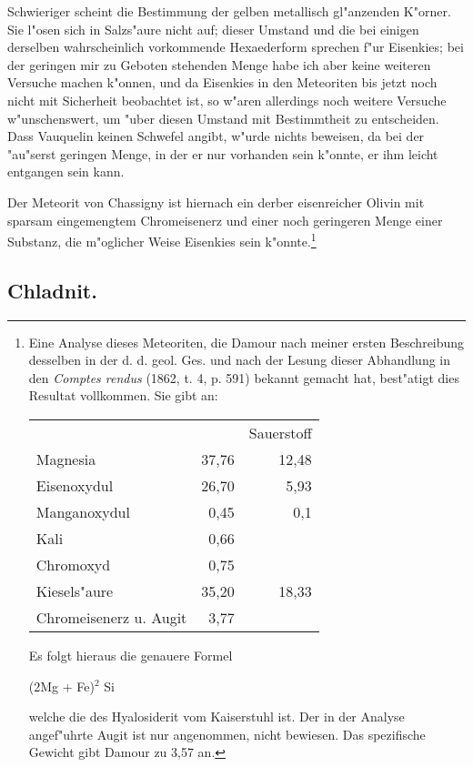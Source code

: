 \documentclass[a4paper, 11pt, oneside, german]{article}
\begin{document}
Schwieriger scheint die Bestimmung der gelben metallisch gl"anzenden K"orner. Sie l"osen sich in Salzs"aure nicht auf; dieser Umstand und die bei einigen derselben wahrscheinlich vorkommende Hexaederform sprechen f"ur Eisenkies; bei der geringen mir zu Geboten stehenden Menge habe ich aber keine weiteren Versuche machen k"onnen, und da Eisenkies in den Meteoriten bis jetzt noch nicht mit Sicherheit beobachtet ist, so w"aren allerdings noch weitere Versuche w"unschenswert, um "uber diesen Umstand mit Bestimmtheit zu entscheiden. Dass Vauquelin keinen Schwefel angibt, w"urde nichts beweisen, da bei der "au"serst geringen Menge, in der er nur vorhanden sein k"onnte, er ihm leicht entgangen sein kann.

Der Meteorit von Chassigny ist hiernach ein derber eisenreicher Olivin mit sparsam eingemengtem Chromeisenerz und einer noch geringeren Menge einer Substanz, die m"oglicher Weise Eisenkies sein k"onnte.\footnote{Eine Analyse dieses Meteoriten, die Damour nach meiner ersten Beschreibung desselben in der d. d. geol. Ges. und nach der Lesung dieser Abhandlung in den \emph{Comptes rendus} (1862, t. 4, p. 591) bekannt gemacht hat, best"atigt dies Resultat vollkommen. Sie gibt an:
\begin{center}
\begin{tabular}{ l r r }
     & & Sauerstoff\\
    Magnesia & 37,76 & 12,48\\
    Eisenoxydul & 26,70 & 5,93\\
    Manganoxydul & 0,45 & 0,1\\
    Kali & 0,66 & \\
    Chromoxyd & 0,75 & \\
    Kiesels"aure & 35,20 & 18,33\\
    Chromeisenerz u. Augit & 3,77 & \\
\end{tabular}
\end{center}
Es folgt hieraus die genauere Formel
\begin{center}
(2Mg + Fe)$^{2}$ Si
\end{center}
welche die des Hyalosiderit vom Kaiserstuhl ist. Der in der Analyse angef"uhrte Augit ist nur angenommen, nicht bewiesen. Das spezifische Gewicht gibt Damour zu 3,57 an.}
\subsection{Chladnit.}
\end{document}
